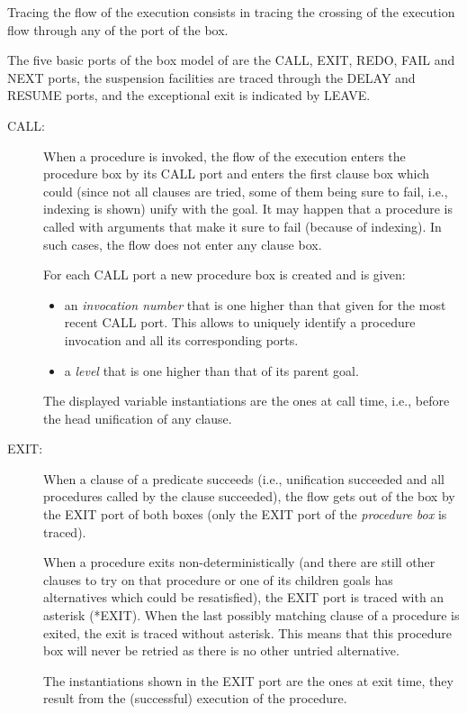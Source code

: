 Tracing the flow of the execution consists in tracing the crossing of
the execution flow through any of the port of the box.

The five basic ports of the box model of {\eclipse} are the CALL, EXIT,
REDO, FAIL and NEXT ports, the suspension facilities are traced through
the DELAY and RESUME ports, and the exceptional exit is indicated by LEAVE.

\begin{description}

\item[CALL:] When a procedure is invoked, the flow of the execution
enters the procedure box by its CALL port and enters the first clause
box which could (since not all clauses are tried, some of them being
sure to fail, i.e., indexing is shown) unify with the goal.
It may happen that a procedure is
called with arguments that make it sure to fail (because of
indexing). In such cases, the flow does not enter any clause box.

For each CALL port a new procedure box is created and is given:
\begin{itemize}
\item an \emph{invocation number} that is one higher than that given for
the most recent CALL port. This allows to uniquely identify a
procedure invocation and all its corresponding ports.

\item a \emph{level} that is one higher than that of its parent goal.
\end{itemize}

The displayed variable instantiations are the ones at call time,
i.e., before the head unification of any clause.

\item[EXIT:] When a clause of a predicate succeeds (i.e., unification
succeeded and all procedures called by the clause succeeded),
the flow gets out of the box by the EXIT port of both boxes (only
the EXIT port of the \emph{procedure box} is traced).

When a procedure exits non-deterministically (and there are still
other clauses to try on that procedure or one of its children goals
has alternatives which could be resatisfied), the EXIT port is traced
with an asterisk (*EXIT). When the last possibly matching clause of a
procedure is exited, the exit is traced without asterisk. This means
that this procedure box will never be retried as there is no other
untried alternative.

The instantiations shown in the EXIT port are the ones at exit time,
they result from the (successful) execution of the procedure.


\end{description}
